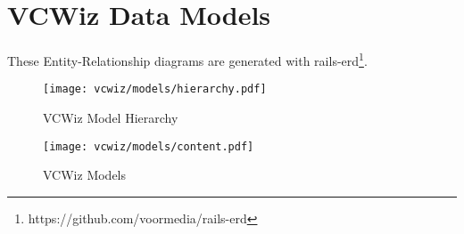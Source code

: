 \chapter{VCWiz Data Models}

These Entity-Relationship diagrams are generated with rails-erd\footnote{https://github.com/voormedia/rails-erd}.

\begin{figure}
  \texttt{[image: vcwiz/models/hierarchy.pdf]}
  \caption{VCWiz Model Hierarchy}
  \label{vcwiz:model:hierarchy}
  \centering
\end{figure}

\begin{figure}
  \texttt{[image: vcwiz/models/content.pdf]}
  \caption{VCWiz Models}
  \label{vcwiz:model:content}
  \centering
\end{figure}

\clearpage
\newpage
